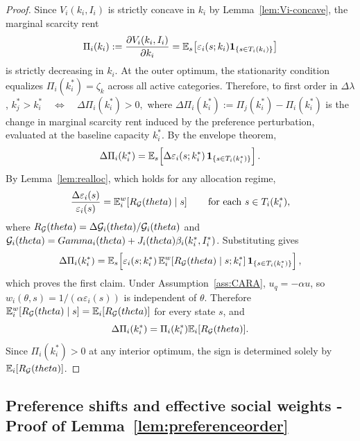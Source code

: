 \documentclass{class}
\begin{document}
\begin{proof}
Since $V_i(k_i,I_i)$ is strictly concave in $k_i$ by Lemma~\ref{lem:Vi-concave}, the marginal scarcity rent
\[
\Pi_i(k_i):=\frac{\partial V_i(k_i,I_i)}{\partial k_i}
=
\mathbb{E}_s\!\left[
\varepsilon_i(s;k_i)\mathbf{1}_{\{s\in T_i(k_i)\}}
\right]
\]
is strictly decreasing in $k_i$. At the outer optimum, the stationarity condition equalizes $\Pi_i(k_i^\ast)=\zeta_k$ across all active categories. Therefore, to first order in $\Delta\lambda$,
$k_j^\ast>k_i^\ast \quad\Longleftrightarrow\quad \Delta \Pi_i(k_i^\ast)>0,$
where $\Delta \Pi_i(k_i^\ast):=\Pi_j(k_i^\ast)-\Pi_i(k_i^\ast)$ is the change in marginal scarcity rent induced by the preference perturbation, evaluated at the baseline capacity $k_i^\ast$. By the envelope theorem,
\[
\Delta \Pi_i(k_i^\ast)
=
\mathbb{E}_s\!\left[
\Delta \varepsilon_i(s;k_i^\ast)\,
\mathbf{1}_{\{s\in T_i(k_i^\ast)\}}
\right].
\]
By Lemma~\ref{lem:realloc}, which holds for any allocation regime,
\[
\frac{\Delta\varepsilon_i(s)}{\varepsilon_i(s)}
=
\mathbb{E}_i^w\!\left[R_{\mathcal{G}}(theta)\mid s\right]
\qquad
\text{for each } s\in T_i(k_i^\ast),
\]
where $R_{\mathcal{G}}(theta)=\Delta \mathcal{G}_i(theta)/\mathcal{G}_i(theta)$ and $\mathcal{G}_i(theta)=Gamma_i(theta)+J_i(theta)\beta_i(k_i^\ast,I_i^\ast)$. Substituting gives
\[
\Delta \Pi_i(k_i^\ast)
=
\mathbb{E}_s\!\left[
\varepsilon_i(s;k_i^\ast)\,
\mathbb{E}_i^w\!\left[R_{\mathcal{G}}(theta)\mid s;k_i^\ast\right]
\mathbf{1}_{\{s\in T_i(k_i^\ast)\}}
\right],
\]
which proves the first claim. Under Assumption~\ref{ass:CARA}, $u_q=-\alpha u$, so $w_i(\theta,s)=1/(\alpha\varepsilon_i(s))$ is independent of $\theta$. Therefore $\mathbb{E}_i^w[R_{\mathcal{G}}(theta)\mid s]=\mathbb{E}_i[R_{\mathcal{G}}(theta)]$ for every state $s$, and
\begin{equation}\label{eq:proof-DeltaPi-CARA}
\Delta \Pi_i(k_i^\ast)=\Pi_i(k_i^\ast)\mathbb{E}_i[R_{\mathcal{G}}(theta)].
\end{equation}
Since $\Pi_i(k_i^\ast)>0$ at any interior optimum, the sign is determined solely by $\mathbb{E}_i[R_{\mathcal{G}}(theta)]$.
\end{proof}
\subsection{Preference shifts and effective social weights - Proof of Lemma~\ref{lem:preferenceorder}}\label{proof:preferenceorder}
\end{document}
